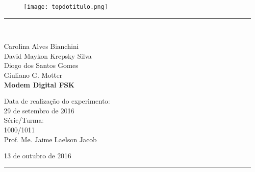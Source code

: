 \begin{titlepage}
\begin{center}
\begin{figure}[h]
\texttt{[image: topdotitulo.png]}
\end{figure}
\rule{\columnwidth}{1.5mm}
\

\large Carolina Alves Bianchini\\
\large David Maykon Krepsky Silva\\
\large Diogo dos Santos Gomes\\
\large Giuliano G. Motter\\

\vspace{4cm}
{\bf \Large Modem Digital FSK}
\vspace{3.5cm}

\begin{flushright}
Data de realização do experimento:\\
29 de setembro de 2016\\
Série/Turma:\\
1000/1011\\
Prof. Me. Jaime Laelson Jacob 
\end{flushright}

\vspace{3.2cm}
13 de outubro de 2016

\rule{\columnwidth}{1.3mm}
\end{center}
\end{titlepage}
